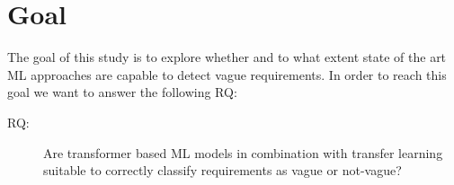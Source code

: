 \section{Goal}
\label{chp:study:sec:goal}
The goal of this study is to explore whether and to what extent state of the art \ac{ML} approaches are capable to detect vague requirements.
In order to reach this goal we want to answer the following \ac{RQ}:

\begin{description}
    \item[\Ac{RQ}:] Are transformer based \ac{ML} models in combination with transfer learning suitable to correctly classify requirements as vague or not-vague?
\end{description}
